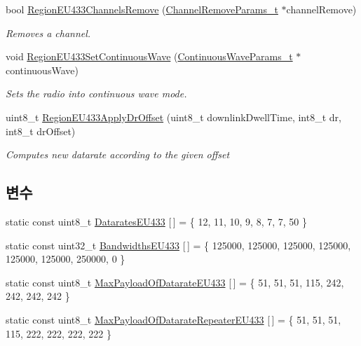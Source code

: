 \begin{DoxyCompactItemize}
bool \mbox{\hyperlink{group___r_e_g_i_o_n_e_u433_ga8c6f83d1c3aadcbc717551c3d4bc912e}{Region\+E\+U433\+Channels\+Remove}} (\mbox{\hyperlink{group___r_e_g_i_o_n_gaa37468560d2fc81a977b57a48e5d72c0}{Channel\+Remove\+Params\+\_\+t}} $\ast$channel\+Remove)
\begin{DoxyCompactList}\small\item\em Removes a channel. \end{DoxyCompactList}\item 
void \mbox{\hyperlink{group___r_e_g_i_o_n_e_u433_ga76561de6c45317a54ded972f7ac80836}{Region\+E\+U433\+Set\+Continuous\+Wave}} (\mbox{\hyperlink{group___r_e_g_i_o_n_gaf39bb5ba06921139c6d17f88a8d518cd}{Continuous\+Wave\+Params\+\_\+t}} $\ast$continuous\+Wave)
\begin{DoxyCompactList}\small\item\em Sets the radio into continuous wave mode. \end{DoxyCompactList}\item 
uint8\+\_\+t \mbox{\hyperlink{group___r_e_g_i_o_n_e_u433_ga1d0c43ec9e4539732c33e625f56104b2}{Region\+E\+U433\+Apply\+Dr\+Offset}} (uint8\+\_\+t downlink\+Dwell\+Time, int8\+\_\+t dr, int8\+\_\+t dr\+Offset)
\begin{DoxyCompactList}\small\item\em Computes new datarate according to the given offset \end{DoxyCompactList}\end{DoxyCompactItemize}
\subsection*{변수}
\begin{DoxyCompactItemize}
\item 
static const uint8\+\_\+t \mbox{\hyperlink{group___r_e_g_i_o_n_e_u433_ga5e9c57bd445d1ba91941c381ef4104c9}{Datarates\+E\+U433}} \mbox{[}$\,$\mbox{]} = \{ 12, 11, 10, 9, 8, 7, 7, 50 \}
\item 
static const uint32\+\_\+t \mbox{\hyperlink{group___r_e_g_i_o_n_e_u433_ga84be709d4ff8c252ddc14460d3a54380}{Bandwidths\+E\+U433}} \mbox{[}$\,$\mbox{]} = \{ 125000, 125000, 125000, 125000, 125000, 125000, 250000, 0 \}
\item 
static const uint8\+\_\+t \mbox{\hyperlink{group___r_e_g_i_o_n_e_u433_gabab90fd75889d31cdde596e5991126aa}{Max\+Payload\+Of\+Datarate\+E\+U433}} \mbox{[}$\,$\mbox{]} = \{ 51, 51, 51, 115, 242, 242, 242, 242 \}
\item 
static const uint8\+\_\+t \mbox{\hyperlink{group___r_e_g_i_o_n_e_u433_gacc4c6c7b7887ab34479b46fbc809c706}{Max\+Payload\+Of\+Datarate\+Repeater\+E\+U433}} \mbox{[}$\,$\mbox{]} = \{ 51, 51, 51, 115, 222, 222, 222, 222 \}
\end{DoxyCompactItemize}



